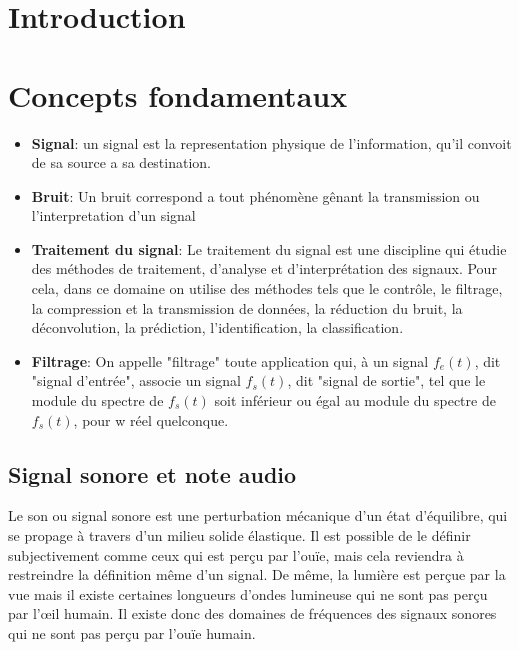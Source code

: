 \documentclass[conference,onecolumn]{IEEEtran}
\begin{document}
\section{Introduction}


\section{Concepts fondamentaux}

\begin{itemize} %
    \item[] \textbf{Signal}: un signal est la representation physique de l'information, qu'il convoit de sa source a sa destination.

    \item[] \textbf{Bruit}: Un bruit correspond a tout phénomène gênant la transmission ou l'interpretation d'un signal

    \item[] \textbf{Traitement du signal}: Le traitement du signal est une discipline qui étudie des méthodes de traitement, d’analyse et d’interprétation des signaux. Pour cela, dans ce domaine on utilise des méthodes tels que le contrôle, le filtrage, la compression et la transmission de données, la réduction du bruit, la déconvolution, la prédiction, l'identification, la classification.  

    \item[] \textbf{Filtrage}: On appelle "filtrage" toute application qui, à un signal $f_e(t)$, dit "signal d'entrée", associe un signal $f_s(t)$, dit "signal de sortie", tel que le module du spectre de $f_s(t)$ soit inférieur ou égal au module du spectre de $f_s(t)$, pour w réel quelconque. 
\end{itemize}

\subsection{Signal sonore et note audio}
Le son ou signal sonore est une perturbation mécanique d’un état d’équilibre, qui se propage à travers d’un milieu solide élastique. Il est possible de le définir subjectivement comme ceux qui est perçu par l’ouïe, mais cela reviendra à restreindre la définition même d’un signal. De même, la lumière est perçue par la vue mais il existe certaines longueurs d’ondes lumineuse qui ne sont pas perçu par l’œil humain. Il existe donc des domaines de fréquences des signaux sonores qui ne sont pas perçu par l’ouïe humain. 
\end{document}
